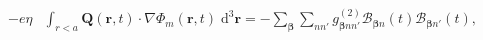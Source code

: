 \documentclass{article}
\begin{document}
\begin{equation}
\begin{split}
-e\eta&\int_{r<a}\mathbf{Q}(\mathbf{r},t)\cdot\nabla\Phi_m(\mathbf{r},t)\;\mathrm{d}^3\mathbf{r}
= -\sum_{\bm{\beta}}\sum_{nn'}g_{\bm{\beta}nn'}^{(2)}\mathcal{B}_{\bm{\beta}n}(t)\mathcal{B}_{\bm{\beta}n'}(t),
\end{split}
\end{equation}
\end{document}
